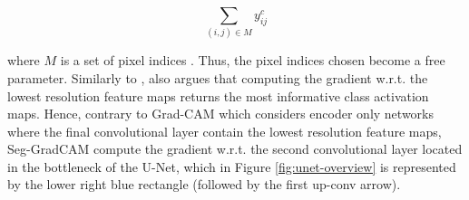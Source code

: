 \documentclass[../main/thesis.tex]{subfiles}
\begin{document}
\begin{equation}
    \sum_{(i,j) \in M} y_{ij}^c
\end{equation}

where $M$ is a set of pixel indices \citep{Vinogradova2020}. Thus, the pixel indices chosen become a free parameter. Similarly to \citet{Selvaraju2016}, \citet{Vinogradova2020} also argues that computing the gradient w.r.t. the lowest resolution feature maps returns the most informative class activation maps. Hence, contrary to Grad-CAM which considers encoder only networks where the final convolutional layer contain the lowest resolution feature maps, Seg-GradCAM compute the gradient w.r.t. the second convolutional layer located in the bottleneck of the U-Net, which in Figure \ref{fig:unet-overview} is represented by the lower right blue rectangle (followed by the first up-conv arrow).

\biblio
\end{document}
